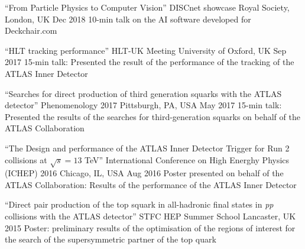 \begin{cventries}
  \cventry
    {``From Particle Physics to Computer Vision''}
    {DISCnet showcase}
    {Royal Society, London, UK}
    {Dec 2018}
    {10-min talk on the AI software developed for Deckchair.com}

  \cventry
    {``HLT tracking performance''}
    {HLT-UK Meeting}
    {University of Oxford, UK}
    {Sep 2017}
    {15-min talk: Presented the result of the performance of the tracking of the ATLAS Inner Detector }

  \cventry
    {``Searches for direct production of third generation squarks with the ATLAS detector''}  
    {Phenomenology 2017}
    {Pittsburgh, PA, USA}
    {May 2017}
    {15-min talk: Presented the results of the searches for third-generation squarks on behalf of the ATLAS Collaboration}

  \cventry
    {``The Design and performance of the ATLAS Inner Detector Trigger for Run 2 collisions at $\sqrt{s} = 13$ TeV''}
    {International Conference on High Energhy Physics (ICHEP) 2016}
    {Chicago, IL, USA}
    {Aug 2016}
    {Poster presented on behalf of the ATLAS Collaboration: Results of the performance of the ATLAS Inner Detector}

  \cventry
    {``Direct pair production of the top squark in all-hadronic final states in \emph{pp} collisions with the ATLAS detector''}
    {STFC HEP Summer School}
    {Lancaster, UK}
    {2015}
    {Poster: preliminary results of the optimisation of the regions of interest for the search of the supersymmetric partner of the top quark}
\end{cventries}